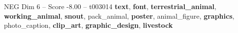 \begin{textsample}{NEG Dim 6 – Score -8.00 – t003014}  \label{ex:f6_neg_024}
\textbf{text}, \textbf{font}, \textbf{terrestrial\_animal}, \textbf{working\_animal}, \textbf{snout}, pack\_animal, \textbf{poster}, animal\_figure, \textbf{graphics}, photo\_caption, \textbf{clip\_art}, \textbf{graphic\_design}, \textbf{livestock}

\end{textsample}
